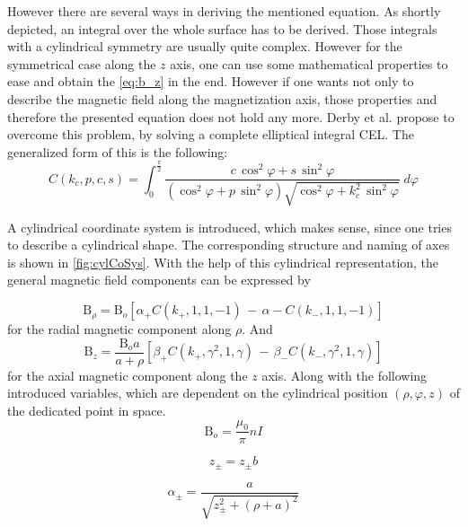 However there are several ways in deriving the mentioned equation. As shortly depicted, an integral over the whole surface has to be derived. Those integrals with a cylindrical symmetry are usually quite complex. However for the symmetrical case along the $ z $ axis, one can use some mathematical properties to ease and obtain the \ref{eq:b_z} in the end. However if one wants not only to describe the magnetic field along the magnetization axis, those properties and therefore the presented equation does not hold any more. Derby et al. \cite{derby2010cylindrical} propose to overcome this problem, by solving a complete elliptical integral \ac{CEL}. The generalized form of this is the following:
\begin{equation}\label{eq:cel}
C(k_{c},p,c,s) = \int_{0}^{\frac{\pi}{2}} \frac{c \, \cos^{2}\varphi + s \, \sin^{2}\varphi}
{(\cos^{2}\varphi + p \, \sin^{2}\varphi)\sqrt{\cos^{2}\varphi + k_{c}^{2} \, \sin^{2}\varphi}} \; d\varphi
\end{equation}

A cylindrical coordinate system is introduced, which makes sense, since one tries to describe a cylindrical shape. The corresponding structure and naming of axes is shown in \ref{fig:cylCoSys}. With the help of this cylindrical representation, the general magnetic field components can be expressed by

\begin{equation} \label{eq:cylB_rho}
\mathrm{B}_{\rho} = \mathrm{B}_{o}[\alpha_{+} C(k_{+},1,1,-1) \, - \, \alpha{-} C(k_{-},1,1,-1)]
\end{equation}
for the radial magnetic component along $ \rho $. And
\begin{equation} \label{eq:cylB_z}
\mathrm{B}_{z} = \frac{\mathrm{B}_{o}a}{a+\rho}[\beta_{+} C(k_{+},\gamma^2,1,\gamma) \, - \, \beta_{-} C(k_{-},\gamma^2,1,\gamma)]
\end{equation}
for the axial magnetic component along the $ z $ axis. Along with the following introduced variables, which are dependent on the cylindrical position $ (\rho, \varphi, z) $ of the dedicated point in space.
\begin{equation}
\mathrm{B}_{o} = \frac{\mu_{0}}{\pi}nI
\end{equation}

\begin{equation}
z_{\pm} = z_{\pm} b
\end{equation}

\begin{equation}
\alpha_{\pm} = \frac{a}{\sqrt{z_{\pm}^2+(\rho+a)^2}}
\end{equation}

